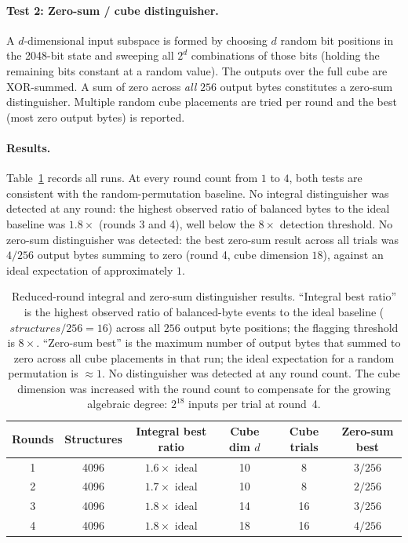\documentclass[11pt,a4paper]{article}
\begin{document}
\paragraph{Test 2: Zero-sum / cube distinguisher.}
A $d$-dimensional input subspace is formed by choosing $d$ random bit
positions in the 2048-bit state and sweeping all $2^d$ combinations of those
bits (holding the remaining bits constant at a random value). The outputs over
the full cube are XOR-summed. A sum of zero across \emph{all} $256$ output
bytes constitutes a zero-sum distinguisher. Multiple random cube placements
are tried per round and the best (most zero output bytes) is reported.

\paragraph{Results.}
Table~\ref{tab:distinguishers} records all runs. At every round count from
$1$ to $4$, both tests are consistent with the random-permutation baseline.
No integral distinguisher was detected at any round: the highest observed
ratio of balanced bytes to the ideal baseline was $1.8\times$ (rounds 3
and 4), well below the $8\times$ detection threshold. No zero-sum
distinguisher was detected: the best zero-sum result across all trials was
$4/256$ output bytes summing to zero (round 4, cube dimension $18$), against
an ideal expectation of approximately $1$.

\begin{table}[h]
\centering
\renewcommand{\arraystretch}{1.2}
\begin{tabular}{cccccc}
  \toprule
  \textbf{Rounds} &
  \textbf{Structures} &
  \textbf{Integral best ratio} &
  \textbf{Cube dim $d$} &
  \textbf{Cube trials} &
  \textbf{Zero-sum best} \\
  \midrule
  1 & 4096 & $1.6\times$ ideal & 10 &  8 & $3 / 256$ \\
  2 & 4096 & $1.7\times$ ideal & 10 &  8 & $2 / 256$ \\
  3 & 4096 & $1.8\times$ ideal & 14 & 16 & $3 / 256$ \\
  4 & 4096 & $1.8\times$ ideal & 18 & 16 & $4 / 256$ \\
  \bottomrule
\end{tabular}
\caption{Reduced-round integral and zero-sum distinguisher results.
``Integral best ratio'' is the highest observed ratio of balanced-byte
events to the ideal baseline ($\mathit{structures}/256 = 16$) across all
$256$ output byte positions; the flagging threshold is $8\times$.
``Zero-sum best'' is the maximum number of output bytes that summed to zero
across all cube placements in that run; the ideal expectation for a random
permutation is $\approx 1$.  No distinguisher was detected at any round
count.  The cube dimension was increased with the round count to compensate
for the growing algebraic degree: $2^{18}$ inputs per trial at round~4.}
\label{tab:distinguishers}
\end{table}
\end{document}
